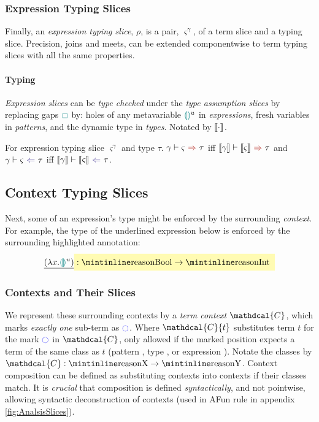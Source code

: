 \subsubsection{Expression Typing Slices}
Finally, an \textit{expression typing slice}, $\rho$, is a pair, $\varsigma^\gamma$, of a term slice and a typing slice. Precision, joins and meets, can be extended componentwise to term typing slices with all the same properties.

\paragraph{Typing} \textit{Expression slices} can be \textit{type checked} under the \textit{type assumption slices} by replacing gaps ${\color{teal}\Box}$ by: holes of any metavariable ${\color{teal}\llparenthesis}  {\color{teal}\rrparenthesis}^u$ in \textit{expressions}, fresh variables in \textit{patterns}, and the dynamic type in \textit{types}. Notated by $\llbracket \cdot \rrbracket$.

\begin{definition}
For expression typing slice $\varsigma^{\gamma}$ and type $\tau$. $\synthesis[\gamma]{\varsigma}{\tau}$ iff $\synthesis[\type{\gamma}]{\type{\varsigma}}{\tau}$ and $\analysis[\gamma]{\varsigma}{\tau}$ iff $\analysis[\type{\gamma}]{\type{\varsigma}}{\tau}$.
\end{definition}
\subsection{Context Typing Slices}\label{sec:ContextTypingSlices}
Next, some of an expression's type might be enforced by the surrounding \textit{context}. For example, the  type of the underlined expression below is enforced by the surrounding highlighted annotation:
\[\underline{(\lambda x. \hole^u )} \hlcmaths[yellow!30]{:  \code{Bool} \hlcmaths[yellow!30]{\to \code{Int}}}\]

\subsubsection{Contexts and Their Slices}
\renewcommand{\C}{\mathdcal{C}}
We represent these surrounding contexts by a \textit{term context} $\mathdcal{C}$, which marks \textit{exactly one} sub-term as $\cmark$. Where $\C\{t\}$ substitutes term $t$ for the mark $\cmark$ in $\C$, only allowed if the marked position expects a term of the same class as $t$ (pattern , type , or expression ). Notate the classes by $\C : \code{X} \to \code{Y}$. Context composition can be defined as substituting contexts into contexts if their classes match. It is \textit{crucial} that composition is defined \textit{syntactically}, and not pointwise, allowing syntactic deconstruction of contexts (used in AFun rule in appendix \cref{fig:AnalsisSlices}).


